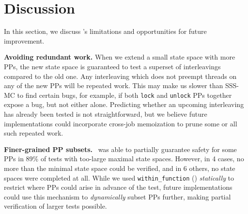 \section{Discussion}
\label{sec:future}

In this section, we discuss \quicksand's limitations and opportunities for future improvement.

{\bf Avoiding redundant work.}
When we extend a small state space with more PPs, the new state space is guaranteed to test a superset of interleavings compared to the old one.
Any interleaving which does not preempt threads on any of the new PPs will be repeated work.
%
This may make us slower than SSS-MC to find certain bugs,
for example, if both {\tt lock} and {\tt unlock} PPs together expose a bug, but not either alone.
Predicting whether an upcoming interleaving has already been tested is not straightforward,
but we believe future implementations
could incorporate cross-job memoization
to prune some or all such repeated work.

{\bf Finer-grained PP subsets.}
\quicksand~was able to partially guarantee safety for some PPs in 89\% of tests with too-large maximal state spaces.
However, in 4 cases, no more than the minimal state space could be verified,
and in 6 others, no state spaces were completed at all.
While we used {\tt within\_function} (\sect{\ref{sec:landslide}}) {\em statically} to restrict where PPs could arise in advance of the test,
future
implementations could use this mechanism to {\em dynamically} subset PPs further,
making partial verification of larger tests possible.

